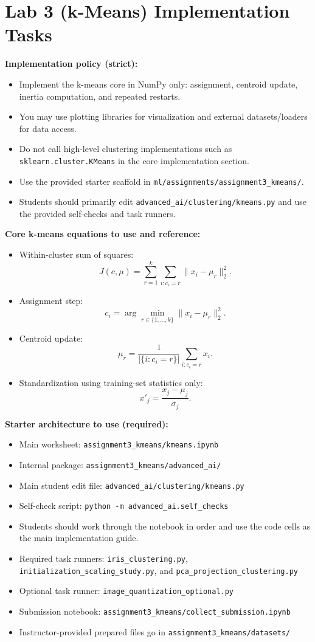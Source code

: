 \section*{Lab 3 (k-Means) Implementation Tasks}
\textbf{Implementation policy (strict):}
\begin{itemize}
  \item Implement the k-means core in NumPy only: assignment, centroid update, inertia computation, and repeated restarts.
  \item You may use plotting libraries for visualization and external datasets/loaders for data access.
  \item Do not call high-level clustering implementations such as \texttt{sklearn.cluster.KMeans} in the core implementation section.
  \item Use the provided starter scaffold in \texttt{ml/assignments/assignment3\_kmeans/}.
  \item Students should primarily edit \texttt{advanced\_ai/clustering/kmeans.py} and use the provided self-checks and task runners.
\end{itemize}

\medskip
\textbf{Core k-means equations to use and reference:}
\begin{itemize}
  \item Within-cluster sum of squares:
  \[
    J(c,\mu)=\sum_{r=1}^{k}\sum_{i:c_i=r}\|x_i-\mu_r\|_2^2.
  \]
  \item Assignment step:
  \[
    c_i=\arg\min_{r \in \{1,\dots,k\}} \|x_i-\mu_r\|_2^2.
  \]
  \item Centroid update:
  \[
    \mu_r=\frac{1}{|\{i:c_i=r\}|}\sum_{i:c_i=r}x_i.
  \]
  \item Standardization using training-set statistics only:
  \[
    x'_j=\frac{x_j-\mu_j}{\sigma_j}.
  \]
\end{itemize}

\medskip
\textbf{Starter architecture to use (required):}
\begin{itemize}
  \item Main worksheet: \texttt{assignment3\_kmeans/kmeans.ipynb}
  \item Internal package: \texttt{assignment3\_kmeans/advanced\_ai/}
  \item Main student edit file: \texttt{advanced\_ai/clustering/kmeans.py}
  \item Self-check script: \texttt{python -m advanced\_ai.self\_checks}
  \item Students should work through the notebook in order and use the code cells as the main implementation guide.
  \item Required task runners: \texttt{iris\_clustering.py}, \texttt{initialization\_scaling\_study.py}, and \texttt{pca\_projection\_clustering.py}
  \item Optional task runner: \texttt{image\_quantization\_optional.py}
  \item Submission notebook: \texttt{assignment3\_kmeans/collect\_submission.ipynb}
  \item Instructor-provided prepared files go in \texttt{assignment3\_kmeans/datasets/}
\end{itemize}

